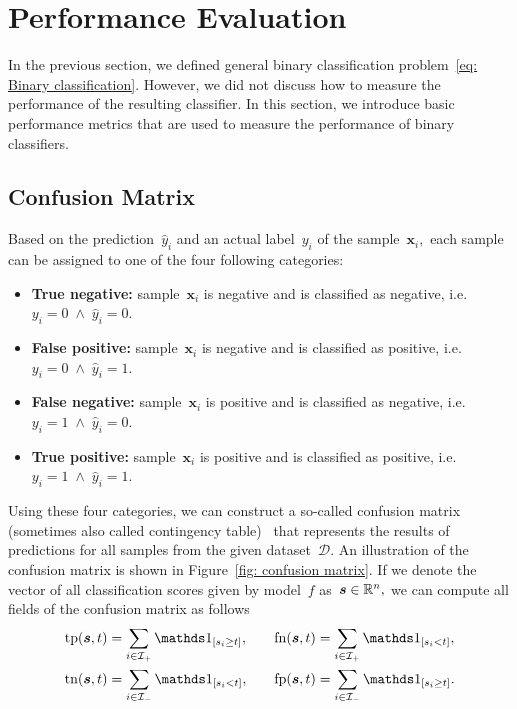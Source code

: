 \section{Performance Evaluation}

In the previous section, we defined general binary classification problem~\ref{eq: Binary classification}. However, we did not discuss how to measure the performance of the resulting classifier. In this section, we introduce basic performance metrics  that are used to measure the performance of binary classifiers.

\subsection{Confusion Matrix}

Based on the prediction~$\hat{y}_i$ and an actual label~$y_i$ of the sample~$\bm{x}_i,$ each sample can be assigned to one of the four following categories:
\begin{itemize}
  \item \textbf{True negative:} sample~$\bm{x}_i$ is negative and is classified as negative, i.e.~$y_i = 0 \; \land \; \hat{y}_i = 0.$
  \item \textbf{False positive:} sample~$\bm{x}_i$ is negative and is classified as positive, i.e.~$y_i = 0 \; \land \; \hat{y}_i = 1.$
  \item \textbf{False negative:} sample~$\bm{x}_i$ is positive and is classified as negative, i.e.~$y_i = 1 \; \land \; \hat{y}_i = 0.$
  \item \textbf{True positive:} sample~$\bm{x}_i$ is positive and is classified as positive, i.e.~$y_i = 1 \; \land \; \hat{y}_i = 1.$
\end{itemize}
Using these four categories, we can construct a so-called confusion matrix (sometimes also called contingency table)~\cite{fawcett2006introduction} that represents the results of predictions for all samples from the given dataset~$\mathcal{D}$. An illustration of the confusion matrix is shown in Figure~\ref{fig: confusion matrix}. If we denote the vector of all classification scores given by model~$f$ as~$\bm{s} \in \mathbb{R}^n,$ we can compute all fields of the confusion matrix as follows
\begin{equation}\label{eq: confusion counts}
  \begin{aligned}
    \tp(\bm{s}, t) & = \sum_{i \in \Ipos}\Iverson{s_i \geq t}, & \quad
    \fn(\bm{s}, t) & = \sum_{i \in \Ipos}\Iverson{s_i < t}, \\
    \tn(\bm{s}, t) & = \sum_{i \in \Ineg}\Iverson{s_i < t}, & \quad
    \fp(\bm{s}, t) & = \sum_{i \in \Ineg}\Iverson{s_i \geq t}.
  \end{aligned}
\end{equation}
